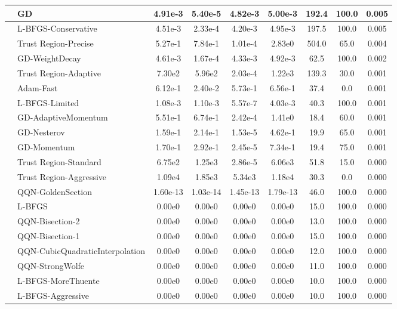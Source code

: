 \documentclass{article}
\begin{document}
\begin{longtable}{|l|l|c|c|c|c|c|c|c|}
\hline
 & GD & 4.91e-3 & 5.40e-5 & 4.82e-3 & 5.00e-3 & 192.4 & 100.0 & 0.005 \\
\hline
 & L-BFGS-Conservative & 4.51e-3 & 2.33e-4 & 4.20e-3 & 4.95e-3 & 197.5 & 100.0 & 0.005 \\
\hline
 & Trust Region-Precise & 5.27e-1 & 7.84e-1 & 1.01e-4 & 2.83e0 & 504.0 & 65.0 & 0.004 \\
\hline
 & GD-WeightDecay & 4.61e-3 & 1.67e-4 & 4.33e-3 & 4.92e-3 & 62.5 & 100.0 & 0.002 \\
\hline
 & Trust Region-Adaptive & 7.30e2 & 5.96e2 & 2.03e-4 & 1.22e3 & 139.3 & 30.0 & 0.001 \\
\hline
 & Adam-Fast & 6.12e-1 & 2.40e-2 & 5.73e-1 & 6.56e-1 & 37.4 & 0.0 & 0.001 \\
\hline
 & L-BFGS-Limited & 1.08e-3 & 1.10e-3 & 5.57e-7 & 4.03e-3 & 40.3 & 100.0 & 0.001 \\
\hline
 & GD-AdaptiveMomentum & 5.51e-1 & 6.74e-1 & 2.42e-4 & 1.41e0 & 18.4 & 60.0 & 0.001 \\
\hline
 & GD-Nesterov & 1.59e-1 & 2.14e-1 & 1.53e-5 & 4.62e-1 & 19.9 & 65.0 & 0.001 \\
\hline
 & GD-Momentum & 1.70e-1 & 2.92e-1 & 2.45e-5 & 7.34e-1 & 19.4 & 75.0 & 0.001 \\
\hline
 & Trust Region-Standard & 6.75e2 & 1.25e3 & 2.86e-5 & 6.06e3 & 51.8 & 15.0 & 0.000 \\
\hline
 & Trust Region-Aggressive & 1.09e4 & 1.85e3 & 5.34e3 & 1.18e4 & 30.3 & 0.0 & 0.000 \\
\hline
 & QQN-GoldenSection & 1.60e-13 & 1.03e-14 & 1.45e-13 & 1.79e-13 & 46.0 & 100.0 & 0.000 \\
\hline
 & L-BFGS & 0.00e0 & 0.00e0 & 0.00e0 & 0.00e0 & 15.0 & 100.0 & 0.000 \\
\hline
 & QQN-Bisection-2 & 0.00e0 & 0.00e0 & 0.00e0 & 0.00e0 & 13.0 & 100.0 & 0.000 \\
\hline
 & QQN-Bisection-1 & 0.00e0 & 0.00e0 & 0.00e0 & 0.00e0 & 15.0 & 100.0 & 0.000 \\
\hline
 & QQN-CubicQuadraticInterpolation & 0.00e0 & 0.00e0 & 0.00e0 & 0.00e0 & 12.0 & 100.0 & 0.000 \\
\hline
 & QQN-StrongWolfe & 0.00e0 & 0.00e0 & 0.00e0 & 0.00e0 & 11.0 & 100.0 & 0.000 \\
\hline
 & L-BFGS-MoreThuente & 0.00e0 & 0.00e0 & 0.00e0 & 0.00e0 & 10.0 & 100.0 & 0.000 \\
\hline
 & L-BFGS-Aggressive & 0.00e0 & 0.00e0 & 0.00e0 & 0.00e0 & 10.0 & 100.0 & 0.000 \\

\end{longtable}
\end{document}
